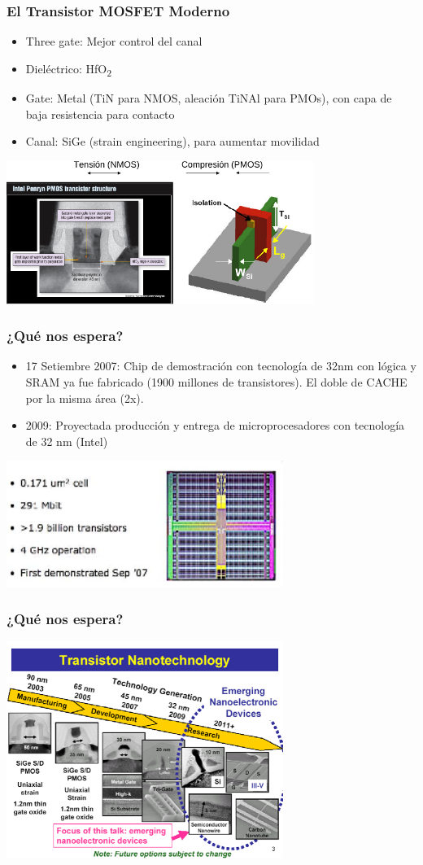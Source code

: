\documentclass[t,aspectratio=169,10pt]{beamer}
\begin{document}
\begin{frame}
\frametitle{El Transistor MOSFET Moderno}
\begin{itemize}
	\item Three gate: Mejor control del canal
	\item Dieléctrico: HfO\textsubscript{2}
	\item Gate: Metal (TiN para NMOS, aleación TiNAl para PMOs), con capa de baja resistencia para contacto
	\item Canal: SiGe (strain engineering), para aumentar movilidad
\end{itemize}

\centering
\includegraphics[width=10cm]{finFET}
\end{frame}


\begin{frame}
\frametitle{¿Qué nos espera?}

\begin{itemize}
	\item 17 Setiembre 2007: Chip de demostración con tecnología de 32nm con lógica y SRAM ya fue fabricado (1900 millones de transistores). El doble de CACHE por la misma área (2x).
	\item 2009: Proyectada producción y entrega de microprocesadores con tecnología de 32 nm (Intel)
\end{itemize}


\centering
\includegraphics[width=9cm]{intel32nm}
\end{frame}


\begin{frame}
\frametitle{¿Qué nos espera?}
\centering
\includegraphics[width=9cm]{nanotech}
\end{frame}
\end{document}
